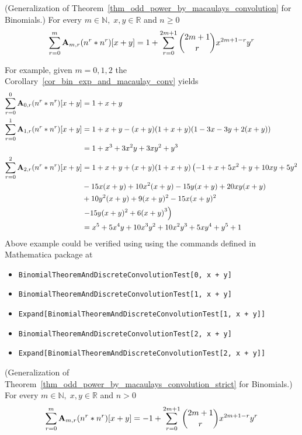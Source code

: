 \begin{cor}
    \label{cor_bin_exp_and_macaulay_conv}
    (Generalization of Theorem~\ref{thm_odd_power_by_macaulays_convolution} for Binomials.)
    For every $m\in\mathbb{N}, \; x,y\in\mathbb{R}$ and $n\geq 0$
    \begin{equation*}
        \sum_{r=0}^{m} {\mathbf{A}} \sb{m,r} (n \sp{r} \ast n \sp{r}) [x+y]
        =
        1 + \sum_{r=0}^{2m+1} \binom{2m+1}{r} x^{2m+1-r} y^r
    \end{equation*}
\end{cor}
For example, given $m=0,1,2$ the Corollary~\ref{cor_bin_exp_and_macaulay_conv} yields
\begin{align*}
    \sum_{r=0}^{0} {\mathbf{A}} \sb{0,r} (n \sp{r} \ast n \sp{r}) [x+y]
    &= 1 + x + y \\
    \sum_{r=0}^{1} {\mathbf{A}} \sb{1,r} (n \sp{r} \ast n \sp{r}) [x+y]
    &= 1 + x + y - (x + y) (1 + x + y) (1 - 3 x - 3 y + 2 (x + y)) \\
    &= 1 + x^3 + 3 x^2 y + 3 x y^2 + y^3\\
    \sum_{r=0}^{2} {\mathbf{A}} \sb{2,r} (n \sp{r} \ast n \sp{r}) [x+y]
    &=1 + x + y + (x + y) (1 + x + y) \left(-1 + x + 5 x^2 + y + 10 x y + 5 y^2\right. \\
    &-15 x (x + y) + 10 x^2 (x + y) - 15 y (x + y) + 20 x y (x + y) \\
    &+ 10 y^2 (x + y) +9 (x + y)^2 - 15 x (x + y)^2 \\
    &\left.-15 y (x + y)^{2} + 6 {(x + y)}^{3}\right) \\
    &=x^5 + 5 x^4 y + 10 x^3 y^2 + 10 x^2 y^3 + 5 x y^4 + y^5 + 1
\end{align*}
Above example could be verified using using the commands defined in Mathematica package at~\cite{github_source_files}
\begin{itemize}
    \item \texttt{BinomialTheoremAndDiscreteConvolutionTest[0, x + y]}
    \item \texttt{BinomialTheoremAndDiscreteConvolutionTest[1, x + y]}
    \item \texttt{Expand[BinomialTheoremAndDiscreteConvolutionTest[1, x + y]]}
    \item \texttt{BinomialTheoremAndDiscreteConvolutionTest[2, x + y]}
    \item \texttt{Expand[BinomialTheoremAndDiscreteConvolutionTest[2, x + y]]}
\end{itemize}
\begin{cor}
    \label{cor_bin_exp_and_macaulay_conv_strict}
    (Generalization of Theorem~\ref{thm_odd_power_by_macaulays_convolution_strict} for Binomials.)
    For every $m\in\mathbb{N}, \; x,y\in\mathbb{R}$ and $n > 0$
    \begin{equation*}
        \sum_{r=0}^{m} {\mathbf{A}} \sb{m,r} (n \sp{r} \ast n \sp{r}) [x+y]
        =
        -1 + \sum_{r=0}^{2m+1} \binom{2m+1}{r} x^{2m+1-r} y^r
    \end{equation*}
\end{cor}
